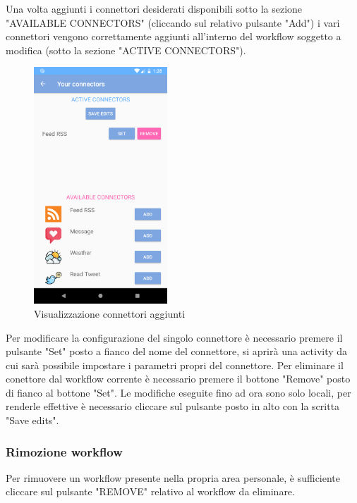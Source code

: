 Una volta aggiunti i connettori desiderati disponibili sotto la sezione "AVAILABLE CONNECTORS" (cliccando sul relativo pulsante "Add") i vari connettori vengono correttamente aggiunti all'interno del workflow soggetto a modifica (sotto la sezione "ACTIVE CONNECTORS").
\begin{figure}[H]
	\centering
	\includegraphics[width=5cm]{../includes/pics/example_connector_added_to_workflow.png}
	\caption{\label{fig:example_connector_added_to_workflow}Visualizzazione connettori aggiunti}
\end{figure}
Per modificare la configurazione del singolo connettore è necessario premere il pulsante "Set" posto a fianco del nome del connettore, si aprirà una activity da cui sarà possibile impostare i parametri propri del connettore.
Per eliminare il conettore dal workflow corrente è necessario premere il bottone "Remove" posto di fianco al bottone "Set".
Le modifiche eseguite fino ad ora sono solo locali, per renderle effettive è necessario cliccare sul pulsante posto in alto con la scritta "Save edits".

\subsubsection{Rimozione workflow}
\label{sec:sec_rimozione_workflow}
Per rimuovere un workflow presente nella propria area personale, è sufficiente cliccare sul pulsante "REMOVE" relativo al workflow da eliminare.